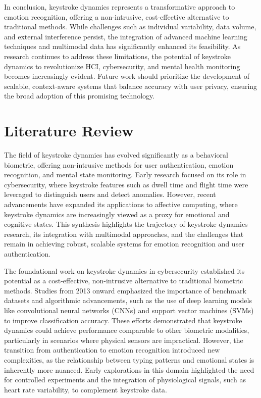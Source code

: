 \documentclass[conference]{IEEEtran}
\begin{document}
In conclusion, keystroke dynamics represents a transformative approach to emotion recognition, offering a non-intrusive, cost-effective alternative to traditional methods. While challenges such as individual variability, data volume, and external interference persist, the integration of advanced machine learning techniques and multimodal data has significantly enhanced its feasibility. As research continues to address these limitations, the potential of keystroke dynamics to revolutionize HCI, cybersecurity, and mental health monitoring becomes increasingly evident. Future work should prioritize the development of scalable, context-aware systems that balance accuracy with user privacy, ensuring the broad adoption of this promising technology.

\section{Literature Review}

The field of keystroke dynamics has evolved significantly as a behavioral biometric, offering non-intrusive methods for user authentication, emotion recognition, and mental state monitoring. Early research focused on its role in cybersecurity, where keystroke features such as dwell time and flight time were leveraged to distinguish users and detect anomalies. However, recent advancements have expanded its applications to affective computing, where keystroke dynamics are increasingly viewed as a proxy for emotional and cognitive states. This synthesis highlights the trajectory of keystroke dynamics research, its integration with multimodal approaches, and the challenges that remain in achieving robust, scalable systems for emotion recognition and user authentication.  

The foundational work on keystroke dynamics in cybersecurity established its potential as a cost-effective, non-intrusive alternative to traditional biometric methods. Studies from 2013 onward emphasized the importance of benchmark datasets and algorithmic advancements, such as the use of deep learning models like convolutional neural networks (CNNs) and support vector machines (SVMs) to improve classification accuracy. These efforts demonstrated that keystroke dynamics could achieve performance comparable to other biometric modalities, particularly in scenarios where physical sensors are impractical. However, the transition from authentication to emotion recognition introduced new complexities, as the relationship between typing patterns and emotional states is inherently more nuanced. Early explorations in this domain highlighted the need for controlled experiments and the integration of physiological signals, such as heart rate variability, to complement keystroke data.  
\end{document}
